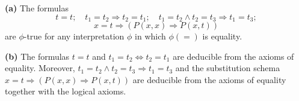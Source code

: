 \textbf{(a)} The formulas
$$t = t; \quad t_1 = t_2 \Rightarrow t_2 = t_1; \quad t_1 = t_2 \wedge t_2 = t_3 \Rightarrow t_1 = t_3;$$
$$x = t \Rightarrow (P(x, x) \Rightarrow P(x, t))$$
are $\phi$-true for any interpretation $\phi$ in which $\phi(=)$ is equality.

\textbf{(b)} The formulas $t = t$ and $t_1 = t_2 \Leftrightarrow t_2 = t_1$ are deducible from the axioms of equality. Moreover, $t_1 = t_2 \wedge t_2 = t_3 \Rightarrow t_1 = t_3$ and the substitution schema $x = t \Rightarrow (P(x, x) \Rightarrow P(x, t))$ are deducible from the axioms of equality together with the logical axioms.
